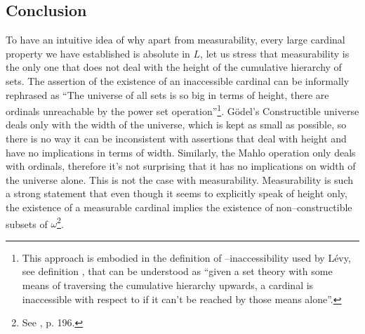 \subsection{Conclusion}
To have an intuitive idea of why apart from measurability, every large cardinal property we have established is absolute in $L$, let us stress that measurability is the only one that does not deal with the height of the cumulative hierarchy of sets.
The assertion of the existence of an inaccessible cardinal can be informally rephrased as
``The universe of all sets is so big in terms of height, there are ordinals unreachable by the power set operation''\footnote{This approach is embodied in the definition of –inaccessibility used by Lévy, see definition , that can be understood as ``given a set theory with some means of traversing the cumulative hierarchy upwards, a cardinal is inaccessible with respect to  if it can't be reached by those means alone''.}. 
Gödel's Constructible universe deals only with the width of the universe, which is kept as small as possible, so there is no way it can be inconsistent with assertions that deal with height and have no implications in terms of width. Similarly, the Mahlo operation only deals with ordinals, therefore it's not surprising that it has no implications on width of the universe alone. 
This is not the case with measurability. 
Measurability is such a strong statement that even though it seems to explicitly speak of height only, 
the existence of a measurable cardinal implies the existence of non–constructible subsets of $\omega$\footnote{See \cite{DrakeBook}, p. 196.}.

